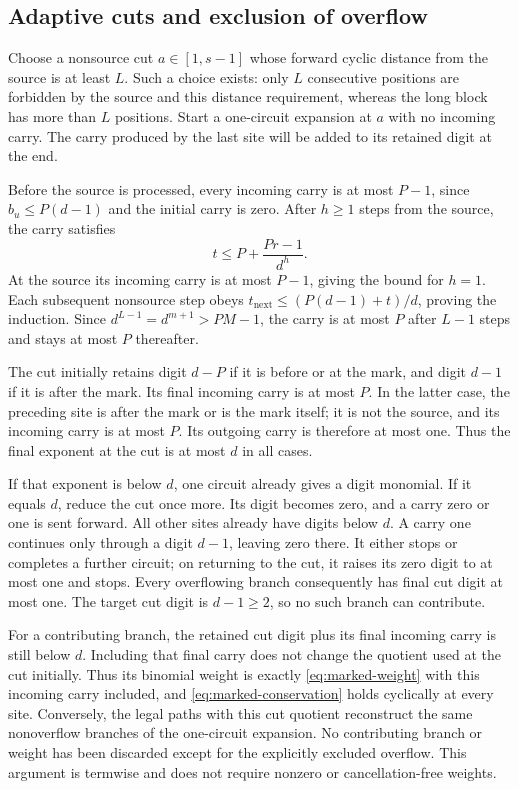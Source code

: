\subsection{Adaptive cuts and exclusion of overflow}

Choose a nonsource cut $a\in[1,s-1]$ whose forward cyclic
distance from the source is at least $L$. Such a choice exists:
only $L$ consecutive positions are forbidden by the source and
this distance requirement, whereas the long block has more than
$L$ positions. Start a one-circuit expansion at $a$ with no
incoming carry. The carry produced by the last site will be
added to its retained digit at the end.

Before the source is processed, every incoming carry is at most
$P-1$, since $b_u\le P(d-1)$ and the initial carry is zero.
After $h\ge1$ steps from the source, the carry satisfies
\begin{equation}
 t\le P+\frac{Pr-1}{d^h}.
 \label{eq:marked-carry-bound}
\end{equation}
At the source its incoming carry is at most $P-1$, giving the
bound for $h=1$. Each subsequent nonsource step obeys
$t_{\mathrm{next}}\le(P(d-1)+t)/d$, proving the induction.
Since $d^{L-1}=d^{m+1}>PM-1$, the carry is at most $P$
after $L-1$ steps and stays at most $P$ thereafter.

The cut initially retains digit $d-P$ if it is before or at
the mark, and digit $d-1$ if it is after the mark. Its final
incoming carry is at most $P$. In the latter case, the preceding
site is after the mark or is the mark itself; it is not the source,
and its incoming carry is at most $P$. Its outgoing carry is
therefore at most one. Thus the final exponent at the cut is
at most $d$ in all cases.

If that exponent is below $d$, one circuit already gives a
digit monomial. If it equals $d$, reduce the cut once more.
Its digit becomes zero, and a carry zero or one is sent forward.
All other sites already have digits below $d$. A carry one
continues only through a digit $d-1$, leaving zero there. It
either stops or completes a further circuit; on returning to
the cut, it raises its zero digit to at most one and stops.
Every overflowing branch consequently has final cut digit at
most one. The target cut digit is $d-1\ge2$, so no such
branch can contribute.

For a contributing branch, the retained cut digit plus its final
incoming carry is still below $d$. Including that final carry
does not change the quotient used at the cut initially.
Thus its binomial weight is exactly \eqref{eq:marked-weight}
with this incoming carry included, and
\eqref{eq:marked-conservation} holds cyclically at every site.
Conversely, the legal paths with this cut quotient reconstruct
the same nonoverflow branches of the one-circuit expansion.
No contributing branch or weight has been discarded except for
the explicitly excluded overflow. This argument is termwise and
does not require nonzero or cancellation-free weights.

